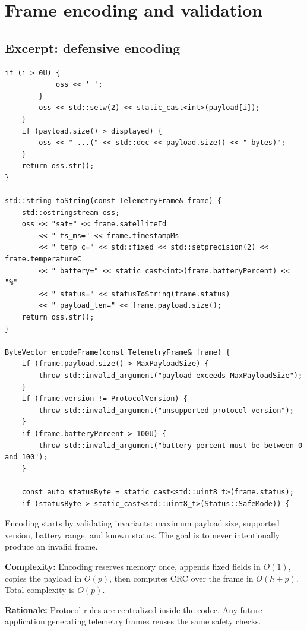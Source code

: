 \documentclass[10pt,a4paper]{article}
\newcommand{\complexity}[1]{\textbf{Complexity:} #1}
\newcommand{\rationale}[1]{\textbf{Rationale:} #1}
\begin{document}
\section{Frame encoding and validation}

\subsection{Excerpt: defensive encoding}
\begin{lstlisting}[caption={Frame encoding with precondition checks}]
        if (i > 0U) {
            oss << ' ';
        }
        oss << std::setw(2) << static_cast<int>(payload[i]);
    }
    if (payload.size() > displayed) {
        oss << " ...(" << std::dec << payload.size() << " bytes)";
    }
    return oss.str();
}

std::string toString(const TelemetryFrame& frame) {
    std::ostringstream oss;
    oss << "sat=" << frame.satelliteId
        << " ts_ms=" << frame.timestampMs
        << " temp_c=" << std::fixed << std::setprecision(2) << frame.temperatureC
        << " battery=" << static_cast<int>(frame.batteryPercent) << "%"
        << " status=" << statusToString(frame.status)
        << " payload_len=" << frame.payload.size();
    return oss.str();
}

ByteVector encodeFrame(const TelemetryFrame& frame) {
    if (frame.payload.size() > MaxPayloadSize) {
        throw std::invalid_argument("payload exceeds MaxPayloadSize");
    }
    if (frame.version != ProtocolVersion) {
        throw std::invalid_argument("unsupported protocol version");
    }
    if (frame.batteryPercent > 100U) {
        throw std::invalid_argument("battery percent must be between 0 and 100");
    }

    const auto statusByte = static_cast<std::uint8_t>(frame.status);
    if (statusByte > static_cast<std::uint8_t>(Status::SafeMode)) {
\end{lstlisting}


Encoding starts by validating invariants: maximum payload size, supported version, battery range, and known status. The goal is to never intentionally produce an invalid frame.

\complexity{Encoding reserves memory once, appends fixed fields in $O(1)$, copies the payload in $O(p)$, then computes CRC over the frame in $O(h+p)$. Total complexity is $O(p)$.}

\rationale{Protocol rules are centralized inside the codec. Any future application generating telemetry frames reuses the same safety checks.}
\end{document}
